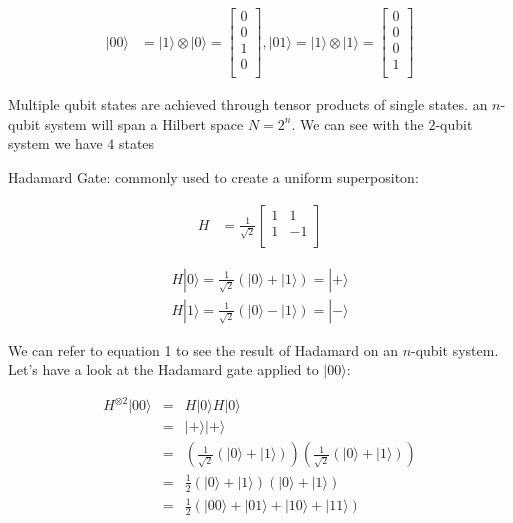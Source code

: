 \documentclass[twocolumn,showpacs,preprintnumbers,amsmath,amssymb]{revtex4}
\begin{document}
		\begin{align*}	
			|00\rangle &= |1\rangle \otimes |0\rangle = \begin{bmatrix}
				0 \\
				0 \\
				1 \\
				0 \\
			\end{bmatrix}, 
			|01\rangle = |1\rangle \otimes |1\rangle = \begin{bmatrix}
				0 \\
				0 \\
				0 \\
				1 \\
			\end{bmatrix}		
		\end{align*}
		
		
		Multiple qubit states are achieved through tensor products of single states.  an $n$-qubit system will span a Hilbert space $N = 2^n $. We can see with the $2$-qubit system we have $4$ states
		
		Hadamard Gate: commonly used to create a uniform superpositon:
		
		\begin{align*}	
			H &=\frac{1}{\sqrt{2}} \begin{bmatrix}
				1 & 1 \\
				1 &-1 \\
			\end{bmatrix}
		\end{align*}
		
		\begin{align*}	
		H|0\rangle = \frac{1}{\sqrt{2}} (|0\rangle + |1\rangle) = |+\rangle\\
		H|1\rangle = \frac{1}{\sqrt{2}} (|0\rangle - |1\rangle) = |-\rangle
		\end{align*}
			
		We can refer to equation 1 to see the result of Hadamard on an $n$-qubit system. Let's have a look at the Hadamard gate applied to $|00\rangle$:
		
		\begin{align*}	
		H^{\otimes 2}|00\rangle &=& H|0\rangle H|0\rangle\\
		&=& |+\rangle|+\rangle\\
		&=& (\frac{1}{\sqrt{2}} (|0\rangle + |1\rangle))(\frac{1}{\sqrt{2}} (|0\rangle + |1\rangle))\\
		&=& \frac{1}{2} (|0\rangle + |1\rangle)(|0\rangle + |1\rangle)\\
		&=& \frac{1}{2} (|00\rangle + |01\rangle + |10\rangle + |11\rangle)\\
		\end{align*}
		
\end{document}

